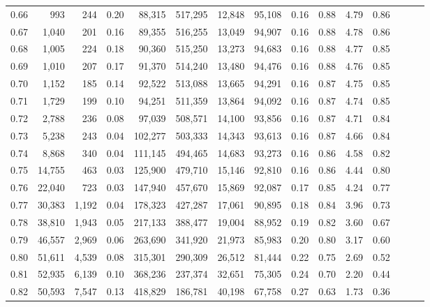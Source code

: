 \begin{tabular}{rrrrrrrrrrrrrrr}
0.66 &     993 &    244 &  0.20 &   88,315 &  517,295 &   12,848 &   95,108 &  0.16 &  0.88 &  4.79 &      0.86 \\
0.67 &   1,040 &    201 &  0.16 &   89,355 &  516,255 &   13,049 &   94,907 &  0.16 &  0.88 &  4.78 &      0.86 \\
0.68 &   1,005 &    224 &  0.18 &   90,360 &  515,250 &   13,273 &   94,683 &  0.16 &  0.88 &  4.77 &      0.85 \\
0.69 &   1,010 &    207 &  0.17 &   91,370 &  514,240 &   13,480 &   94,476 &  0.16 &  0.88 &  4.76 &      0.85 \\
0.70 &   1,152 &    185 &  0.14 &   92,522 &  513,088 &   13,665 &   94,291 &  0.16 &  0.87 &  4.75 &      0.85 \\
0.71 &   1,729 &    199 &  0.10 &   94,251 &  511,359 &   13,864 &   94,092 &  0.16 &  0.87 &  4.74 &      0.85 \\
0.72 &   2,788 &    236 &  0.08 &   97,039 &  508,571 &   14,100 &   93,856 &  0.16 &  0.87 &  4.71 &      0.84 \\
0.73 &   5,238 &    243 &  0.04 &  102,277 &  503,333 &   14,343 &   93,613 &  0.16 &  0.87 &  4.66 &      0.84 \\
0.74 &   8,868 &    340 &  0.04 &  111,145 &  494,465 &   14,683 &   93,273 &  0.16 &  0.86 &  4.58 &      0.82 \\
0.75 &  14,755 &    463 &  0.03 &  125,900 &  479,710 &   15,146 &   92,810 &  0.16 &  0.86 &  4.44 &      0.80 \\
0.76 &  22,040 &    723 &  0.03 &  147,940 &  457,670 &   15,869 &   92,087 &  0.17 &  0.85 &  4.24 &      0.77 \\
0.77 &  30,383 &  1,192 &  0.04 &  178,323 &  427,287 &   17,061 &   90,895 &  0.18 &  0.84 &  3.96 &      0.73 \\
0.78 &  38,810 &  1,943 &  0.05 &  217,133 &  388,477 &   19,004 &   88,952 &  0.19 &  0.82 &  3.60 &      0.67 \\
0.79 &  46,557 &  2,969 &  0.06 &  263,690 &  341,920 &   21,973 &   85,983 &  0.20 &  0.80 &  3.17 &      0.60 \\
0.80 &  51,611 &  4,539 &  0.08 &  315,301 &  290,309 &   26,512 &   81,444 &  0.22 &  0.75 &  2.69 &      0.52 \\
0.81 &  52,935 &  6,139 &  0.10 &  368,236 &  237,374 &   32,651 &   75,305 &  0.24 &  0.70 &  2.20 &      0.44 \\
0.82 &  50,593 &  7,547 &  0.13 &  418,829 &  186,781 &   40,198 &   67,758 &  0.27 &  0.63 &  1.73 &      0.36 \\

\end{tabular}
